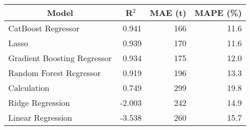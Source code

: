 
\begin{tabular}[t]{lrrr}
\toprule
\multicolumn{1}{c}{Model} & \multicolumn{1}{c}{R$^2$} & \multicolumn{1}{c}{MAE (t)} & \multicolumn{1}{c}{MAPE (\%)}\\
\midrule
CatBoost Regressor & 0.941 & 166 & 11.6\\
Lasso & 0.939 & 170 & 11.6\\
Gradient Boosting Regressor & 0.934 & 175 & 12.0\\
Random Forest Regressor & 0.919 & 196 & 13.3\\
Calculation & 0.749 & 299 & 19.8\\
Ridge Regression & -2.003 & 242 & 14.9\\
Linear Regression & -3.538 & 260 & 15.7\\
\bottomrule
\end{tabular}
